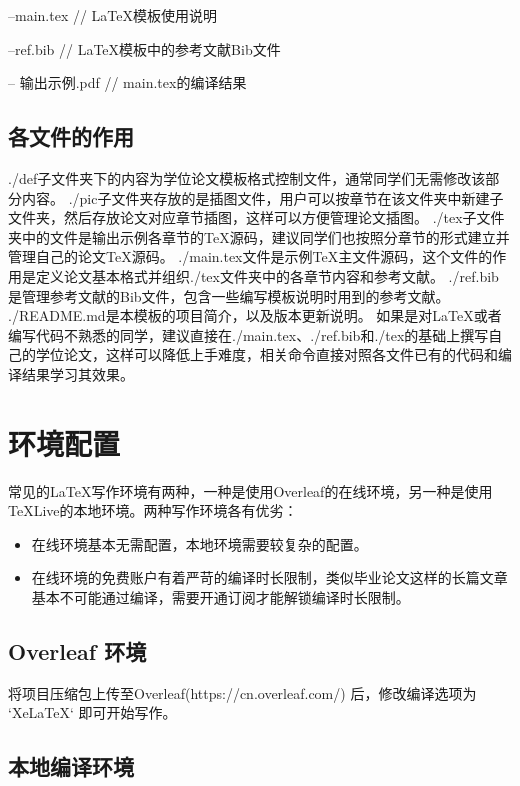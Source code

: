 \quad--main.tex              // LaTeX模板使用说明

\quad--ref.bib                   // LaTeX模板中的参考文献Bib文件

\quad-- 输出示例.pdf              // main.tex的编译结果

\subsection{各文件的作用}

./def子文件夹下的内容为学位论文模板格式控制文件，通常同学们无需修改该部分内容。
./pic子文件夹存放的是插图文件，用户可以按章节在该文件夹中新建子文件夹，然后存放论文对应章节插图，这样可以方便管理论文插图。
./tex子文件夹中的文件是输出示例各章节的TeX源码，建议同学们也按照分章节的形式建立并管理自己的论文TeX源码。
./main.tex文件是示例TeX主文件源码，这个文件的作用是定义论文基本格式并组织./tex文件夹中的各章节内容和参考文献。
./ref.bib是管理参考文献的Bib文件，包含一些编写模板说明时用到的参考文献。
./README.md是本模板的项目简介，以及版本更新说明。
如果是对\LaTeX 或者编写代码不熟悉的同学，建议直接在./main.tex、./ref.bib和./tex的基础上撰写自己的学位论文，这样可以降低上手难度，相关命令直接对照各文件已有的代码和编译结果学习其效果。

\section{环境配置}

常见的\LaTeX 写作环境有两种，一种是使用Overleaf的在线环境，另一种是使用TeXLive的本地环境。两种写作环境各有优劣：
\begin{itemize}
    \item 在线环境基本无需配置，本地环境需要较复杂的配置。
    \item 在线环境的免费账户有着严苛的编译时长限制，类似毕业论文这样的长篇文章基本不可能通过编译，需要开通订阅才能解锁编译时长限制。
\end{itemize}

\subsection{Overleaf 环境}

将项目压缩包上传至Overleaf(https://cn.overleaf.com/) 后，修改编译选项为 `XeLaTeX` 即可开始写作。

\subsection{本地编译环境}

